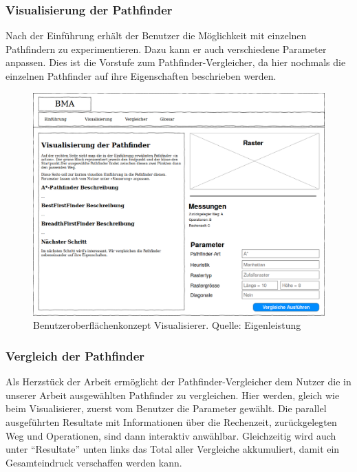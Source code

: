 \documentclass[12pt,a4paper,german]{report}
\begin{document}
\subsubsection{Visualisierung der Pathfinder}
Nach der Einführung erhält der Benutzer die Möglichkeit mit einzelnen Pathfindern zu experimentieren. Dazu kann er auch verschiedene Parameter anpassen. Dies ist die Vorstufe zum Pathfinder-Vergleicher, da hier nochmals die einzelnen Pathfinder auf ihre Eigenschaften beschrieben werden.
\begin{figure}[H]
  \centering
  \includegraphics[width=16cm]{visualisierung1}
  \caption[Benutzeroberflächenkonzept des Pathfinding-Visualisierers.]{Benutzeroberflächenkonzept Visualisierer. Quelle: Eigenleistung}
  \label{fig:gui_konzept_visualizer}
\end{figure}

\clearpage

\subsubsection{Vergleich der Pathfinder}
Als Herzstück der Arbeit ermöglicht der Pathfinder-Vergleicher dem Nutzer die in unserer Arbeit ausgewählten Pathfinder zu vergleichen. Hier werden, gleich wie beim Visualisierer, zuerst vom Benutzer die Parameter gewählt. Die parallel ausgeführten Resultate mit Informationen über die Rechenzeit, zurückgelegten Weg und Operationen, sind dann interaktiv anwählbar. Gleichzeitig wird auch unter ``Resultate'' unten links das Total aller Vergleiche akkumuliert, damit ein Gesamteindruck verschaffen werden kann.
\end{document}
